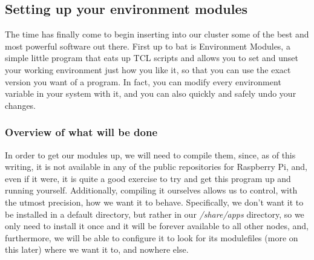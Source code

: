 \documentclass[]{article}
\begin{document}
                                                                         \subsection{Setting up your environment modules}
                                                                         The time has finally come to begin inserting into our cluster some of the best and most powerful software 
                                                                         out there. First up to bat is Environment Modules, a simple little program that eats up TCL scripts and 
                                                                         allows you to set and unset your working environment just how you like it, so that you can use the exact 
                                                                         version you want of a program. In fact, you can modify every environment variable in your system with it, 
                                                                         and you can also quickly and safely undo your changes. \\

                                                                         \subsubsection{Overview of what will be done}
                                                                         In order to get our modules up, we will need to compile them, since, as of this writing, it is not available 
                                                                         in any of the public repositories for Raspberry Pi, and, even if it were, it is quite a good exercise to try 
                                                                         and get this program up and running yourself. Additionally, compiling it ourselves allows us to control, 
                                                                         with the utmost precision, how we want it to behave. Specifically, we don't want it to be installed in a 
                                                                         default directory, but rather in our \textit{/share/apps} directory, so we only need to install it once and 
                                                                         it will be forever available to all other nodes, and, furthermore, we will be able to configure it to look 
                                                                         for its modulefiles (more on this later) where we want it to, and nowhere else. \\
\end{document}
